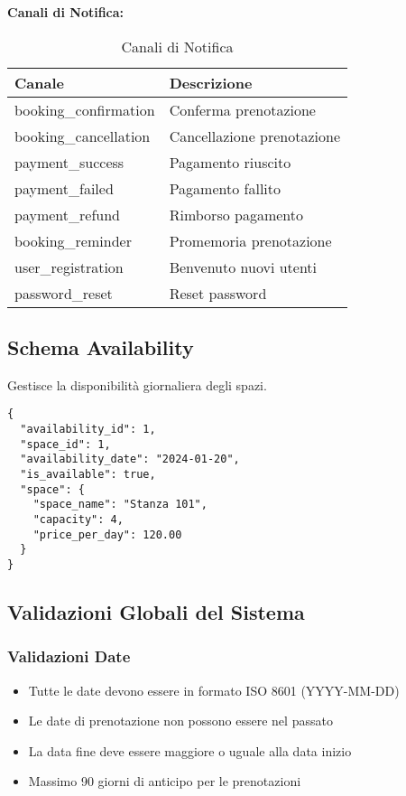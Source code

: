 \newpage

\textbf{Canali di Notifica:}
\begin{table}[H]
\centering
\begin{tabular}{@{}ll@{}}
\toprule
\textbf{Canale} & \textbf{Descrizione} \\
\midrule
booking\_confirmation & Conferma prenotazione \\
booking\_cancellation & Cancellazione prenotazione \\
payment\_success & Pagamento riuscito \\
payment\_failed & Pagamento fallito \\
payment\_refund & Rimborso pagamento \\
booking\_reminder & Promemoria prenotazione \\
user\_registration & Benvenuto nuovi utenti \\
password\_reset & Reset password \\
\bottomrule
\end{tabular}
\caption{Canali di Notifica}
\end{table}

\subsection{Schema Availability}
Gestisce la disponibilità giornaliera degli spazi.

\begin{lstlisting}[caption=Schema Availability]
{
  "availability_id": 1,
  "space_id": 1,
  "availability_date": "2024-01-20",
  "is_available": true,
  "space": {
    "space_name": "Stanza 101",
    "capacity": 4,
    "price_per_day": 120.00
  }
}
\end{lstlisting}

\subsection{Validazioni Globali del Sistema}

\subsubsection{Validazioni Date}
\begin{itemize}
    \item Tutte le date devono essere in formato ISO 8601 (YYYY-MM-DD)
    \item Le date di prenotazione non possono essere nel passato
    \item La data fine deve essere maggiore o uguale alla data inizio
    \item Massimo 90 giorni di anticipo per le prenotazioni
\end{itemize}

